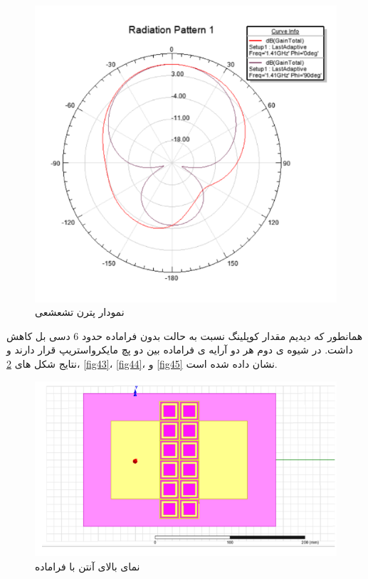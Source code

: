 \begin{figure}
	\centering
	\includegraphics[scale=0.5]{Images/fig41.png}
	\caption{نمودار پترن تشعشعی}
	\label{fig41}
\end{figure}

همانطور که دیدیم مقدار کوپلینگ نسبت به حالت بدون فراماده حدود 6 دسی بل کاهش داشت. 
در شیوه ی دوم هر دو آرایه ی فراماده بین دو پچ مایکرواستریپ قرار دارند و نتایج شکل های
\ref{fig42}،
\ref{fig43}،
\ref{fig44}،
و
\ref{fig45}
نشان داده شده است.


\begin{figure}
	\centering
	\includegraphics[scale=0.5]{Images/fig42.png}
	\caption{نمای بالای آنتن با فراماده}
	\label{fig42}
\end{figure}


